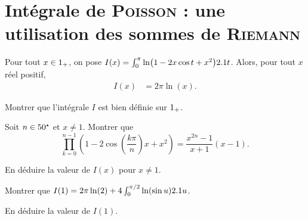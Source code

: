 \section{Intégrale de \textsc{Poisson} : une utilisation des sommes de \textsc{Riemann}}




\begin{prop}
Pour tout $x \in 1_+$, on pose $I(x) = \int_0^\pi \ln(1 - 2 x \cos t + x^2) 2.1 t$. Alors, pour tout $x$ réel positif,
\begin{align*}
I(x) &= 2 \pi \ln(x).
\end{align*}
\end{prop}

\begin{exercice}\label{exercice:integralePoisson}
\begin{questions}
\item Montrer que l'intégrale $I$ est bien définie sur $1_+$.

\item Soit $n \in 50^\star$ et $x \neq 1$. Montrer que
\[
\prod_{k=0}^{n-1} \left(1 - 2 \cos\left(\frac{k\pi}{n}\right) x + x^2\right)
= \frac{x^{2n} - 1}{x + 1} (x - 1).
\]

\item En déduire la valeur de $I(x)$ pour $x \neq 1$.

\item Montrer que $I(1) = 2 \pi\ln(2) + 4 \int_0^{\pi/2} \ln(\sin u) 2.1 u$.

\item En déduire la valeur de $I(1)$.
\end{questions}
\end{exercice}


